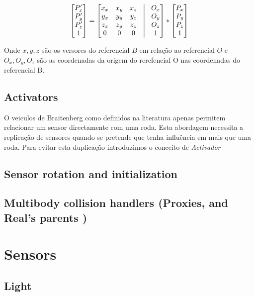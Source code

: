 \documentclass[a4paper]{article}
\begin{document}
\[
 	\begin{bmatrix}
		P_{x}' \\
		P_{y}' \\
		P_{z}' \\
		1 
	\end{bmatrix}
	=
	\begin{bmatrix}
		x_{x} & x_{y} & x_{z} & \vline & O_{x}	\\
		y_{x} & y_{y} & y_{z} & \vline & O_{y}	\\
		z_{x} & z_{y} & z_{z} & \vline & O_{z}	\\
		0 & 0 & 0 & \vline & 1 	\\
	\end{bmatrix}
	*
 	\begin{bmatrix}
		P_{x} \\
		P_{y} \\
		P_{z} \\
		1 
	\end{bmatrix}
\]

Onde $x, y, z$ são os versores do referencial $B$ em relação ao referencial $O$ e $O_{x}, O_{y}, O_{z}$ são as coordenadas da origem do rerefencial O nas coordenadas do referencial B. 

\subsection{Activators}
\indent \indent O veiculos de Braitenberg como definidos na literatura apenas permitem relacionar um sensor directamente com uma roda.
Esta abordagem necessita a replicação de sensores quando se pretende que tenha influência em mais que uma roda.
Para evitar esta duplicação introduzimos o conceito de \emph{Activador}

\subsection{Sensor rotation and initialization}
\indent \indent 

\subsection{Multibody collision handlers (Proxies, and Real's parents )}
\indent \indent

\cleardoublepage
\section{Sensors}

\subsection{Light}
\end{document}
